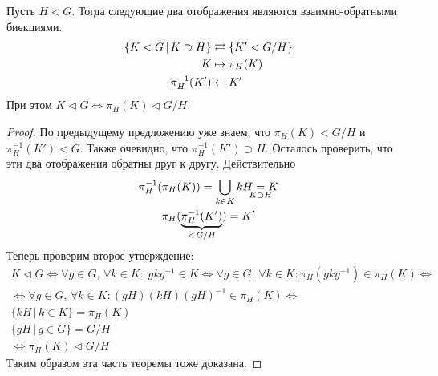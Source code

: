 \documentclass[../main.tex]{subfiles}
\begin{document}
\begin{theorem}[о соответствии]
  Пусть $H \triangleleft G$. Тогда следующие два отображения являются взаимно-обратными биекциями.
  \begin{align*}
    \{K < G \, | \, K \supset H\} &\rightleftarrows \{K' < G/H\} \\
    K &\mapsto \pi_H(K) \\
    \pi_H^{-1}(K') &\leftmapsto K'
  \end{align*}
  При этом $K \triangleleft G \iff \pi_H(K) \triangleleft G/H$.
\end{theorem}
\begin{proof}
  По предыдущему предложению уже знаем, что $\pi_H(K) < G/H$ и $\pi_H^{-1}(K') < G$. Также очевидно, что $\pi_H^{-1}(K') \supset H$. Осталось проверить, что эти два отображения обратны друг к другу. Действительно
  \begin{equation*}
    \begin{gathered}
      \pi_H^{-1}(\pi_H(K)) = \bigcup\limits_{k \in K} kH \underset{\mathclap{K \supset H}}{=} K \\
      \pi_H(\underbrace{\pi_H^{-1}(K')}_{\mathclap{ < \,G/H}}) = K'
    \end{gathered}
  \end{equation*}
  Теперь проверим второе утверждение:
  \begin{equation*}
    \begin{gathered}
      K \triangleleft G \iff \forall g \in G, \, \forall k \in K\colon \; gkg^{-1} \in K
      \iff \forall g \in G, \, \forall k \in K\colon \pi_H(gkg^{-1}) \in \pi_H(K) \iff \\
      \iff \forall g \in G, \, \forall k \in K\colon (gH)(kH)(gH)^{-1} \in \pi_H(K) \iff \\
      \{kH \, | \, k \in K\} = \pi_H(K) \\
      \{gH \, | \, g \in G\} = G/H \\
      \iff \pi_H(K) \triangleleft G/H
    \end{gathered}
  \end{equation*}
  Таким образом эта часть теоремы тоже доказана.
\end{proof}
\end{document}
